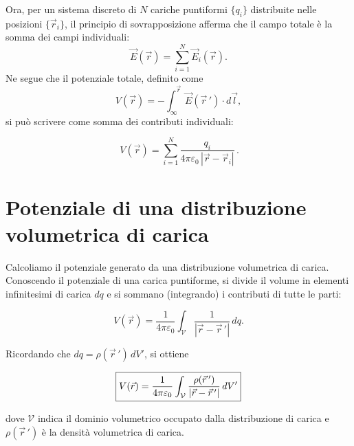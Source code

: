 \documentclass{book}
\begin{document}
Ora, per un sistema discreto di \(N\) cariche puntiformi \(\{q_i\}\) distribuite nelle posizioni \(\{\vec r_i\}\), il principio di sovrapposizione afferma che il campo totale è la somma dei campi individuali:
\[
\vec{E}(\vec r)=\sum_{i=1}^N \vec{E}_i(\vec r).
\]
Ne segue che il potenziale totale, definito come
\[
V(\vec r) = -\int_{\infty}^{\vec r} \vec{E}(\vec r\,')\cdot d\vec l,
\]
si può scrivere come somma dei contributi individuali:

\[
\boxed{\,V(\vec r)=\sum_{i=1}^{N}\dfrac{q_i}{4\pi\varepsilon_0\,|\vec r-\vec r_i|}\, .}
\]

\section{Potenziale di una distribuzione volumetrica di carica}

Calcoliamo il potenziale generato da una distribuzione volumetrica di carica. Conoscendo il potenziale di una carica puntiforme, si divide il volume in elementi infinitesimi di carica \(dq\) e si sommano (integrando) i contributi di tutte le parti:

\[
V(\vec{r}) = \frac{1}{4\pi\varepsilon_0}\int_{\mathcal{V}}\frac{1}{|\vec{r}-\vec{r}\,'|}\,dq.
\]

Ricordando che \(dq=\rho(\vec{r}\,')\,dV'\), si ottiene

\[
\boxed{%
V(\vec{r}) = \frac{1}{4\pi\varepsilon_0}\int_{\mathcal{V}}\frac{\rho(\vec{r}\,')}{|\vec{r}-\vec{r}\,'|}\,dV'
}
\]

dove \(\mathcal{V}\) indica il dominio volumetrico occupato dalla distribuzione di carica e \(\rho(\vec r\,')\) è la densità volumetrica di carica.
\end{document}
